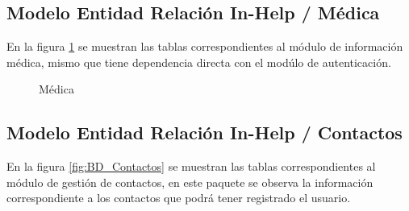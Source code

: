 \subsection{Modelo Entidad Relación In-Help / Médica}
En la figura \ref{fig:BD_Medica} se muestran las tablas correspondientes al módulo de información médica, mismo que tiene dependencia directa con el modúlo de autenticación.
\begin{figure}[htbp!]
	\centering
	\caption{Médica}
	\label{fig:BD_Medica}
\end{figure}

\subsection{Modelo Entidad Relación In-Help / Contactos}

En la figura \ref{fig:BD_Contactos} se muestran las tablas correspondientes al módulo de gestión de contactos, en este paquete se observa la información correspondiente a los contactos que podrá tener registrado el usuario.

